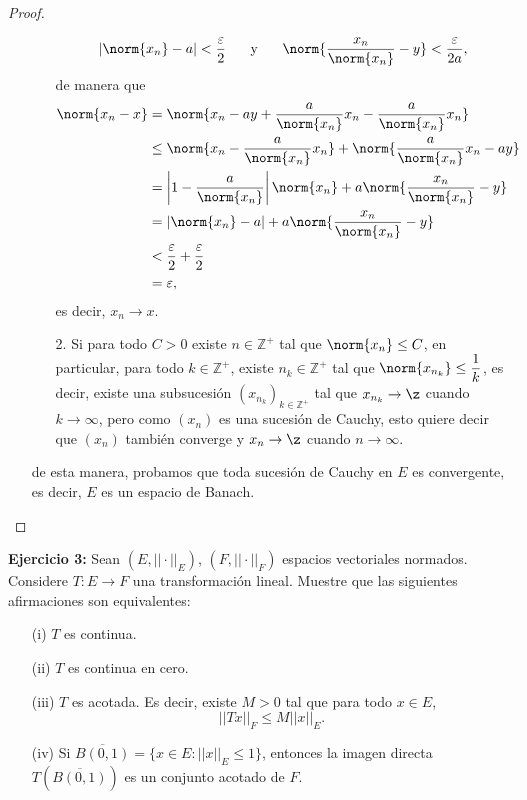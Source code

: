 \begin{proof}
\begin{itemize}
\begin{enumerate}
            \begin{align*}
                |\norm{x_n}-a|<\frac{\varepsilon}{2} \hspace{5mm} \text{ y } \hspace{5mm} \norm{\frac{x_n}{\norm{x_n}}-y}<\frac{\varepsilon}{2a},
            \end{align*}
            de manera que
            \begin{align*}
                \norm{x_n-x}&=\norm{x_n-ay+\frac{a}{\norm{x_n}}x_n-\frac{a}{\norm{x_n}}x_n}\\
                &\leq \norm{x_n-\frac{a}{\norm{x_n}}x_n}+\norm{\frac{a}{\norm{x_n}}x_n-ay}\\
                &=\left|1-\frac{a}{\norm{x_n}}\right|\norm{x_n}+a\norm{\frac{x_n}{\norm{x_n}}-y}\\
                &=|\norm{x_n}-a|+a\norm{\frac{x_n}{\norm{x_n}}-y}\\
                &<\frac{\varepsilon}{2}+\frac{\varepsilon}{2}\\
                &=\varepsilon,
            \end{align*}
            es decir, $x_n\to x$.

            \item[2.] Si para todo $C>0$ existe $n\in \mathbb{Z}^+$ tal que $\norm{x_n}\leq C$, en particular, para todo $k \in \mathbb{Z}^+$, existe $n_k\in \mathbb{Z}^+$ tal que $\norm{x_{n_k}}\leq \dfrac{1}{k}$, es decir, existe una subsucesión $(x_{n_k})_{k \in \mathbb{Z}^+}$ tal que $x_{n_k}\to \z$ cuando $k\to \infty$, pero como $(x_n)$ es una sucesión de Cauchy, esto quiere decir que $(x_n)$ también converge y $x_n\to \z$ cuando $n \to \infty$.
        \end{enumerate}
        de esta manera, probamos que toda sucesión de Cauchy en $E$ es convergente, es decir, $E$ es un espacio de Banach.
    \end{itemize}
\end{proof}


\textbf{Ejercicio 3:} Sean $(E, ||\cdot ||_E)$, $(F, ||\cdot||_F)$ espacios vectoriales normados. Considere $T:E\to F$ una transformación lineal. Muestre que las siguientes afirmaciones son equivalentes:
\begin{itemize}
    \item[(i)] $T$ es continua.
    \item[(ii)] $T$ es continua en cero.
    \item[(iii)] $T$ es acotada. Es decir, existe $M>0$ tal que para todo $x\in E$, 
    $$||Tx||_F \leq M ||x||_E.$$
    \item[(iv)] Si $\overline{B(0,1)}=\{x\in E: ||x||_E \leq 1\}$, entonces la imagen directa $T(\overline{B(0,1)})$ es un conjunto acotado de $F$.
\end{itemize}

